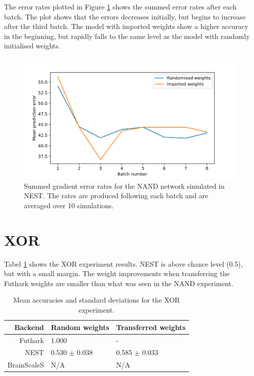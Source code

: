 \documentclass[report.tex]{subfiles}
\begin{document}
The error rates plotted in Figure \ref{fig:nand_snn} shows the summed error
rates after each batch.
The plot shows that the errors decreases initially, but begins
to increase after the third batch.
The model with imported weights show a higher accuracy in the beginning, 
but rapidly falls to the same level as the model with randomly initialised
weights.

\begin{figure}
  \includegraphics[width=\linewidth]{images/nand.png}
  \caption{Summed gradient error rates for the NAND network simulated in NEST. The rates
  are produced following each batch and are averaged over 10 simulations.}
  \label{fig:nand_snn}
\end{figure}
\FloatBarrier

\section{XOR}

Tabel \ref{tab:nand} shows the XOR experiment results. 
NEST is above chance level (0.5), but with a small margin. The 
weight improvements when transferring the Futhark weights are smaller than 
what was seen in the NAND experiment.

\begin{table}
  \begin{tabular}{r l l}
  Backend & Random weights & Transferred weights \\ \hline
  Futhark & 1.000 & - \\ 
  NEST & 0.530 $\pm$ 0.038 & 0.585 $\pm$ 0.033 \\
  BrainScaleS & N/A & N/A
  \end{tabular}
  \caption{Mean accuracies and standard deviations for the XOR experiment.}
  \label{tab:nand}
\end{table}
\end{document}
